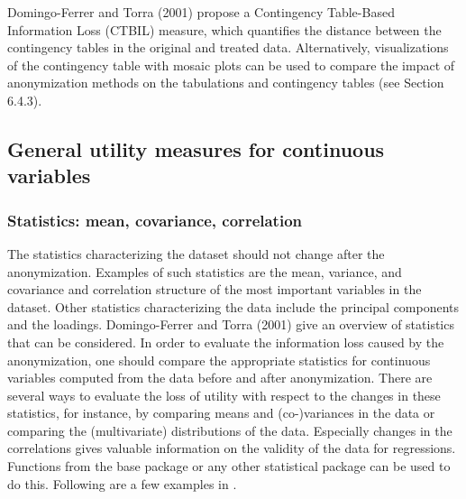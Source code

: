 \documentclass[letterpaper,10pt,english]{sphinxmanual}
\begin{document}
\begin{DUlineblock}{0em}
\item[] 
\item[] 
\item[] 
\item[] 
\item[] 
\item[] 
\item[] 
\item[] 
\end{DUlineblock}

Domingo-Ferrer and Torra (2001) propose a Contingency Table-Based
Information Loss (CTBIL) measure, which quantifies the distance between
the contingency tables in the original and treated data. Alternatively,
visualizations of the contingency table with mosaic plots can be used to
compare the impact of anonymization methods on the tabulations and
contingency tables (see Section 6.4.3).


\subsection{General utility measures for continuous variables}
\label{\detokenize{utility:general-utility-measures-for-continuous-variables}}

\subsubsection{Statistics: mean, covariance, correlation}
\label{\detokenize{utility:statistics-mean-covariance-correlation}}
The statistics characterizing the dataset should not change after the
anonymization. Examples of such statistics are the mean, variance, and
covariance and correlation structure of the most important variables in
the dataset. Other statistics characterizing the data include the
principal components and the loadings. Domingo-Ferrer and Torra (2001)
give an overview of statistics that can be considered. In order to
evaluate the information loss caused by the anonymization, one should
compare the appropriate statistics for continuous variables computed
from the data before and after anonymization. There are several ways to
evaluate the loss of utility with respect to the changes in these
statistics, for instance, by comparing means and (co-)variances in the
data or comparing the (multivariate) distributions of the data.
Especially changes in the correlations gives valuable information on the
validity of the data for regressions. Functions from the  base
package or any other statistical package can be used to do this.
Following are a few examples in .
\end{document}
